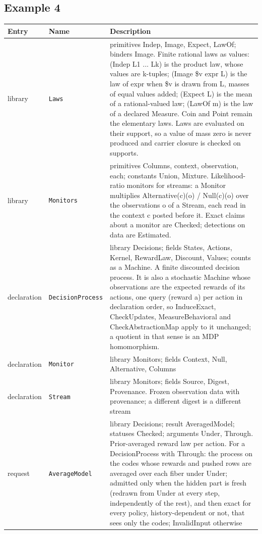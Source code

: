 \documentclass[11pt]{article}
\newcommand{\code}[1]{\texttt{#1}}
\theoremstyle{definition}
\theoremstyle{plain}
\begin{document}
\subsection{Example 4}
\begin{footnotesize}
\begin{longtable}{>{\raggedright\arraybackslash}p{2.2cm}>{\raggedright\arraybackslash}p{4.1cm}>{\raggedright\arraybackslash}p{7.9cm}}
\toprule
Entry & Name & Description\\
\midrule
\endhead
library & \code{Laws} & primitives Indep, Image, Expect, LawOf; binders Image. Finite rational laws as values:\allowbreak{} (Indep L1 ... Lk) is the product law, whose values are k-tuples; (Image \$v expr L) is the law of expr when \$v is drawn from L, masses of equal values added; (Expect L) is the mean of a rational-valued law; (LawOf m) is the law of a declared Measure.  Coin and Point remain the elementary laws.  Laws are evaluated on their support, so a value of mass zero is never produced and carrier closure is checked on supports.\\
library & \code{Monitors} & primitives Columns, context, observation, each; constants Union, Mixture. Likelihood-ratio monitors for streams:\allowbreak{} a Monitor multiplies Alternative(c)(o) / Null(c)(o) over the observations o of a Stream, each read in the context c posted before it.  Exact claims about a monitor are Checked; detections on data are Estimated.\\
declaration & \code{DecisionProcess} & library Decisions; fields States, Actions, Kernel, RewardLaw, Discount, Values; counts as a Machine. A finite discounted decision process.  It is also a stochastic Machine whose observations are the expected rewards of its actions, one query (reward a) per action in declaration order, so InduceExact, CheckUpdates, MeasureBehavioral and CheckAbstractionMap apply to it unchanged; a quotient in that sense is an MDP homomorphism.\\
declaration & \code{Monitor} & library Monitors; fields Context, Null, Alternative, Columns\\
declaration & \code{Stream} & library Monitors; fields Source, Digest, Provenance. Frozen observation data with provenance; a different digest is a different stream\\
request & \code{AverageModel} & library Decisions; result AveragedModel; statuses Checked; arguments Under, Through. Prior-averaged reward law per action.  For a DecisionProcess with Through:\allowbreak{} the process on the codes whose rewards and pushed rows are averaged over each fiber under Under; admitted only when the hidden part is fresh (redrawn from Under at every step, independently of the rest), and then exact for every policy, history-dependent or not, that sees only the codes; InvalidInput otherwise\\

\end{longtable}
\end{footnotesize}
\end{document}
